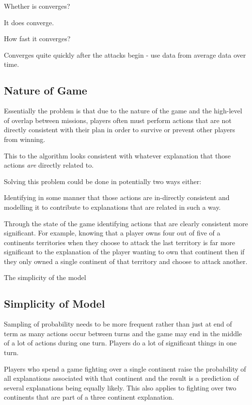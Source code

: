 \documentclass[parskip]{cs4rep}
\begin{document}
Whether is converges?

It does converge.

How fast it converges?

Converges quite quickly after the attacks begin - use data from average data over time.

\subsection{Nature of Game}

Essentially the problem is that due to the nature of the game and the high-level of overlap between missions, players often must perform actions that are not directly consistent with their plan in order to survive or prevent other players from winning.

This to the algorithm looks consistent with whatever explanation that those actions \textit{are} directly related to.

Solving this problem could be done in potentially two ways either:

Identifying in some manner that those actions are in-directly consistent and modelling it to contribute to explanations that are related in such a way.
 
Through the state of the game identifying actions that are clearly consistent more significant. For example, knowing that a player owns four out of five of a continents territories when they choose to attack the last territory is far more significant to the explanation of the player wanting to own that continent then if they only owned a single continent of that territory and choose to attack another.

The simplicity of the model 

\subsection{Simplicity of Model}

Sampling of probability needs to be more frequent rather than just at end of term as many actions occur between turns and the game may end in the middle of a lot of actions during one turn. Players do a lot of significant things in one turn.

Players who spend a game fighting over a single continent raise the probability of all explanations associated with that continent and the result is a prediction of several explanations being equally likely. This also applies to fighting over two continents that are part of a three continent explanation.
\end{document}
